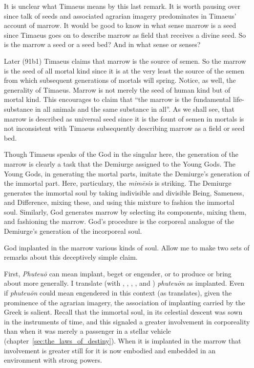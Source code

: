 It is unclear what Timaeus means by this last remark. It is worth pausing over since talk of seeds and associated agrarian imagery predominates in Timaeus' account of marrow. It would be good to know in what sense marrow is a seed since Timaeus goes on to describe marrow as field that receives a divine seed. So is the marrow a seed or a seed bed? And in what sense or senses?

Later (91b1) Timaeus claims that marrow is the source of semen. So the marrow is the seed of all mortal kind since it is at the very least the source of the semen from which subsequent generations of mortals will spring. Notice, as well, the generality of Timaeus. Marrow is not merely the seed of human kind \citep[73]{Waterfield:2008lx} but of mortal kind. This encourages \citet[295]{Cornford:1935fk} to claim that ``the marrow is the fundamental life-substance in all animals and the same substance in all''. As we shall see, that marrow is described as universal seed since it is the fount of semen in mortals is not inconsistent with Timaeus subsequently describing marrow as a field or seed bed.

Though Timaeus speaks of the God in the singular here, the generation of the marrow is clearly a task that the Demiurge assigned to the Young Gods. The Young Gods, in generating the mortal parts, imitate the Demiurge's generation of the immortal part. Here, particulary, the \emph{mimēsis} is striking. The Demiurge generates the immortal soul by taking indivisible and divisible Being, Sameness, and Difference, mixing these, and using this mixture to fashion the immortal soul. Similarly, God generates marrow by selecting its components, mixing them, and fashioning the marrow. God's procedure is the corporeal analogue of the Demiurge's generation of the incorporeal soul.

God implanted in the marrow various kinds of soul. Allow me to make two sets of remarks about this deceptively simple claim.

First, \emph{Phuteuō} can mean implant, beget or engender, or to produce or bring about more generally. I translate (with \citealt[271]{Archer-Hind:1888qd}, \citealt[293]{Cornford:1935fk}, \citealt[70]{Lee:2008ca}, \citealt[77]{Taylor:1929ov} \citealt[73]{Waterfield:2003gs}, and \citealt[67]{Zeyl:2000cs}) \emph{phuteuōn} as implanted. Even if \emph{phuteuōn} could mean engendered in this context (as \citealt[191--3]{Bury:1929jb} translates), given the prominence of the agrarian imagery, the association of implanting carried by the Greek is salient. Recall that the immortal soul, in its celestial descent was sown in the instruments of time, and this signaled a greater involvement in corporeality than when it was merely a passenger in a stellar vehicle (chapter~\ref{sec:the_laws_of_destiny}). When it is implanted in the marrow that involvement is greater still for it is now embodied and embedded in an environment with strong powers.

